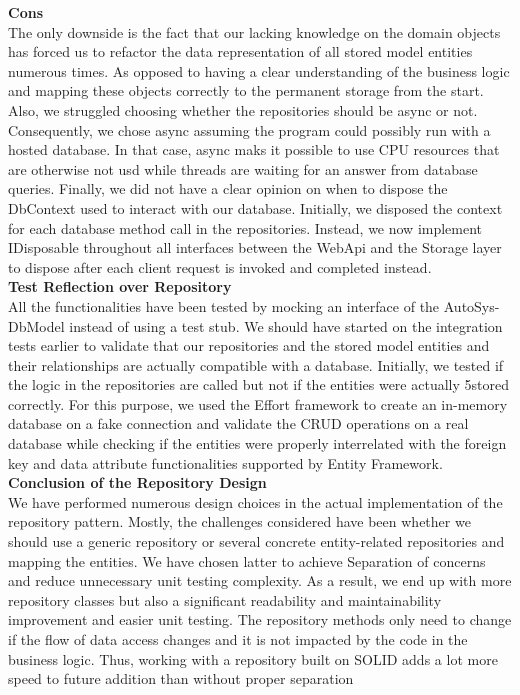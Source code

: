 \textbf{Cons}\\
The only downside is the fact that our lacking knowledge on the domain objects
has forced us to refactor the data representation of all stored model entities numerous
times. As opposed to having a clear understanding of the business logic
and mapping these objects correctly to the permanent storage from the start.
Also, we struggled choosing whether the repositories should be async or not.
Consequently, we chose async assuming the program could possibly run with a
hosted database. In that case, async maks it possible to use CPU resources that
are otherwise not usd while threads are waiting for an answer from database
queries. Finally, we did not have a clear opinion on when to dispose the DbContext
used to interact with our database. Initially, we disposed the context for
each database method call in the repositories. Instead, we now implement IDisposable
throughout all interfaces between the WebApi and the Storage layer to
dispose after each client request is invoked and completed instead.\\

\textbf{Test Reflection over Repository}\\
All the functionalities have been tested by mocking an interface of the AutoSys-
DbModel instead of using a test stub. We should have started on the integration
tests earlier to validate that our repositories and the stored model entities and
their relationships are actually compatible with a database. Initially, we tested
if the logic in the repositories are called but not if the entities were actually
5stored correctly. For this purpose, we used the Effort framework to create an
in-memory database on a fake connection and validate the CRUD operations on
a real database while checking if the entities were properly interrelated with the
foreign key and data attribute functionalities supported by Entity Framework.\\

\textbf{Conclusion of the Repository Design}\\
We have performed numerous design choices in the actual implementation of
the repository pattern. Mostly, the challenges considered have been whether we
should use a generic repository or several concrete entity-related repositories
and mapping the entities. We have chosen latter to achieve Separation of concerns
and reduce unnecessary unit testing complexity. As a result, we end up
with more repository classes but also a significant readability and maintainability
improvement and easier unit testing. The repository methods only need to
change if the flow of data access changes and it is not impacted by the code in
the business logic. Thus, working with a repository built on SOLID adds a lot
more speed to future addition than without proper separation